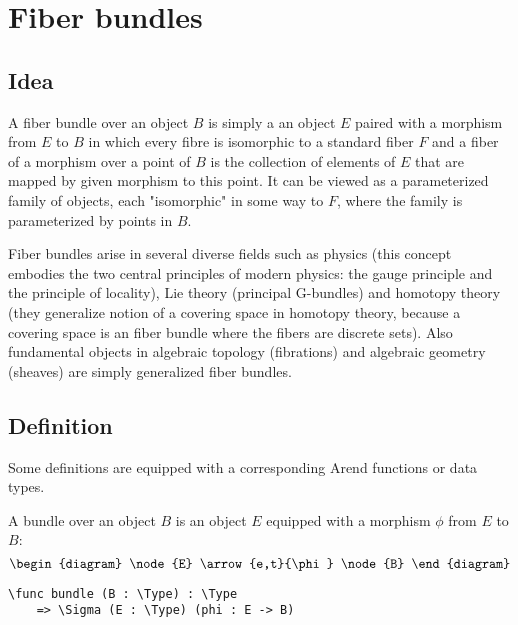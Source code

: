 
\section{Fiber bundles}
\label{sec:fiberbundles}

\subsection{Idea}
A fiber bundle over an object $B$ is simply a an object $E$ paired with a morphism from $E$ to $B$ in which every fibre is isomorphic to a standard fiber $F$ and a fiber of a morphism over a point of $B$ is the collection of elements of $E$ that are mapped by given morphism to this point. It can be viewed as a parameterized family of objects, each "isomorphic" in some way to $F$, where the family is parameterized by points in $B$.

Fiber bundles arise in several diverse fields such as physics (this concept embodies the two central principles of modern physics: the gauge principle and the principle of locality), Lie theory (principal G-bundles) and homotopy theory (they generalize notion of a covering space in homotopy theory, because a covering space is an fiber bundle where the fibers are discrete sets). Also fundamental objects in algebraic topology (fibrations) and algebraic geometry (sheaves) are simply generalized fiber bundles.

\subsection{Definition}

Some definitions are equipped with a corresponding Arend functions or data types.

\begin{mydefinition}[Bundle]
	A bundle over an object $B$ is an object $E$ equipped with a morphism $\phi$ from $E$ to $B$:
	\[
	\begin{diagram}
		\node{E} 
			\arrow{e,t}{\phi} 
		\node{B} 
	\end{diagram}
	\]
	
	\begin{ListingEnv}[H]
	\begin{lstlisting}
\func bundle (B : \Type) : \Type 
	=> \Sigma (E : \Type) (phi : E -> B)
	\end{lstlisting}
	\end{ListingEnv}
\end{mydefinition}

